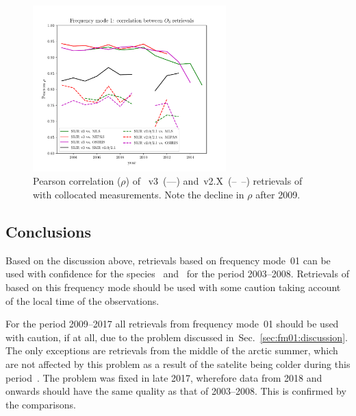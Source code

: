 \begin{figure}[ht]
    \centering
    \includegraphics[width=0.666\textwidth]{../DDS/figures/DDS_fm1_O3_corr}
    \caption{Pearson correlation ($\rho$) of \smr~v3~(---) and~v2.X~(--~--)
    retrievals of  with collocated measurements. Note the decline in
    $\rho$ after 2009.}
    \label{fig:fm01:O3:corr}
\end{figure}


\subsection{Conclusions}
\label{sec:fm01:conclusions}
Based on the discussion above, retrievals based on frequency mode~01 can be
used with confidence for the species~ and~ for the
period 2003--2008. Retrievals of  based on this frequency mode
should be used with some caution taking account of the local time of the
observations.

For the period 2009--2017  all retrievals from frequency mode~01 should be used
with  caution, if at all, due to the problem discussed
in~Sec.~\ref{sec:fm01:discussion}. The only exceptions are retrievals from the
middle of the arctic summer, which are not affected by this problem as a result
of the satelite being colder during this period~\cite{postlaunch:2006}. The
problem was fixed in late 2017, wherefore data from 2018 and onwards should
have the same quality as that of 2003--2008. This is confirmed by the comparisons.